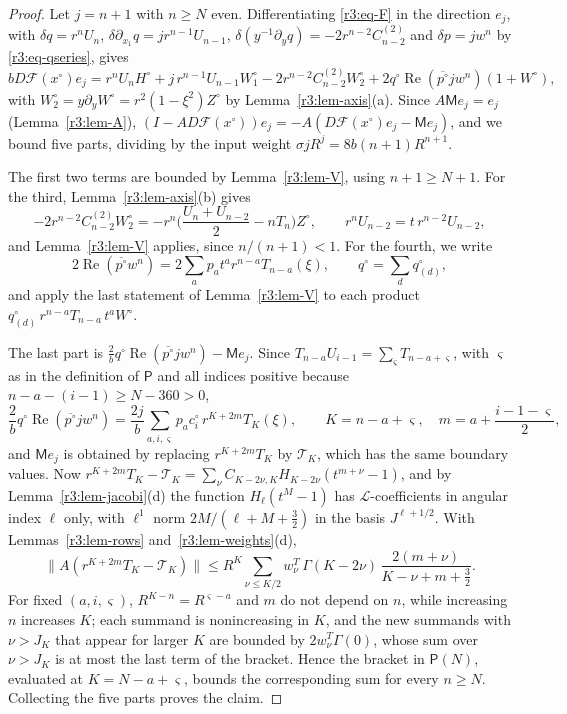 \documentclass[11pt]{amsart}
\theoremstyle{definition}
\theoremstyle{remark}
\numberwithin{equation}{section}
\newcommand{\Fc}{\mathcal{F}}
\DeclareMathOperator{\re}{Re}
\newcommand{\nrm}[1]{\lVert #1\rVert}
\begin{document}
\begin{proof}
Let $j=n+1$ with $n\geq N$ even. Differentiating \eqref{r3:eq-F} in the direction $e_j$, with $\delta q=r^nU_n$, $\delta\partial_{x_1}q=jr^{n-1}U_{n-1}$, $\delta(y^{-1}\partial_yq)=-2r^{n-2}C^{(2)}_{n-2}$ and $\delta p=jw^n$ by \eqref{r3:eq-qseries}, gives
\[
bD\Fc(x^\circ)e_j=r^nU_nH^\circ+j\,r^{n-1}U_{n-1}W^\circ_1-2r^{n-2}C^{(2)}_{n-2}W^\circ_2+2q^\circ\re(\overline{p^\circ}jw^n)(1+W^\circ),
\]
with $W^\circ_2=y\partial_yW^\circ=r^2(1-\xi^2)Z^\circ$ by Lemma~\ref{r3:lem-axis}(a). Since $A\mathsf Me_j=e_j$ (Lemma~\ref{r3:lem-A}), $(I-AD\Fc(x^\circ))e_j=-A(D\Fc(x^\circ)e_j-\mathsf Me_j)$, and we bound five parts, dividing by the input weight $\sigma jR^j=8b(n+1)R^{n+1}$.

The first two terms are bounded by Lemma~\ref{r3:lem-V}, using $n+1\geq N+1$. For the third, Lemma~\ref{r3:lem-axis}(b) gives
\[
-2r^{n-2}C^{(2)}_{n-2}W^\circ_2=-r^n\Big(\frac{U_n+U_{n-2}}2-nT_n\Big)Z^\circ,\qquad r^nU_{n-2}=t\,r^{n-2}U_{n-2},
\]
and Lemma~\ref{r3:lem-V} applies, since $n/(n+1)<1$. For the fourth, we write
\[
2\re(\overline{p^\circ}w^n)=2\sum_ap_at^ar^{n-a}T_{n-a}(\xi),\qquad q^\circ=\sum_dq^\circ_{(d)},
\]
and apply the last statement of Lemma~\ref{r3:lem-V} to each product $q^\circ_{(d)}\,r^{n-a}T_{n-a}\,t^aW^\circ$.

The last part is $\frac2bq^\circ\re(\overline{p^\circ}jw^n)-\mathsf Me_j$. Since $T_{n-a}U_{i-1}=\sum_\varsigma T_{n-a+\varsigma}$, with $\varsigma$ as in the definition of $\mathsf P$ and all indices positive because $n-a-(i-1)\geq N-360>0$,
\[
\frac2bq^\circ\re(\overline{p^\circ}jw^n)=\frac{2j}b\sum_{a,i,\varsigma}p_ac^\circ_i\,r^{K+2m}T_K(\xi),\qquad K=n-a+\varsigma,\quad m=a+\frac{i-1-\varsigma}2,
\]
and $\mathsf Me_j$ is obtained by replacing $r^{K+2m}T_K$ by $\mathcal T_K$, which has the same boundary values. Now $r^{K+2m}T_K-\mathcal T_K=\sum_\nu C_{K-2\nu,K}H_{K-2\nu}(t^{m+\nu}-1)$, and by Lemma~\ref{r3:lem-jacobi}(d) the function $H_\ell(t^M-1)$ has $\mathcal L$-coefficients in angular index $\ell$ only, with $\ell^1$ norm $2M/(\ell+M+\frac32)$ in the basis $J^{\ell+1/2}$. With Lemmas~\ref{r3:lem-rows} and~\ref{r3:lem-weights}(d),
\[
\nrm{A(r^{K+2m}T_K-\mathcal T_K)}\leq R^K\sum_{\nu\leq K/2}w^T_\nu\,\Gamma(K-2\nu)\,\frac{2(m+\nu)}{K-\nu+m+\frac32} .
\]
For fixed $(a,i,\varsigma)$, $R^{K-n}=R^{\varsigma-a}$ and $m$ do not depend on $n$, while increasing $n$ increases $K$; each summand is nonincreasing in $K$, and the new summands with $\nu>J_K$ that appear for larger $K$ are bounded by $2w^T_\nu\Gamma(0)$, whose sum over $\nu>J_K$ is at most the last term of the bracket. Hence the bracket in $\mathsf P(N)$, evaluated at $K=N-a+\varsigma$, bounds the corresponding sum for every $n\geq N$. Collecting the five parts proves the claim.
\end{proof}
\end{document}
